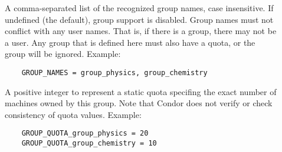 \begin{description}

\item[] \label{param:GroupNames}
  A comma-separated list of the recognized group names, case insensitive.
  If undefined (the default), group support is disabled.
  Group names must not conflict with any user names.
  That is, if there is a \verb@physics@ group, there may not be
  a \verb@physics@ user.
  Any group that is defined here must also have a quota,
  or the group will be ignored. Example: 
  \begin{verbatim}
    GROUP_NAMES = group_physics, group_chemistry 
  \end{verbatim}

\item[] \label{param:GroupQuotaGroupname}
  A positive integer  to represent a static quota specifing
  the exact number of machines owned by this group.
  Note that Condor does not verify or check consistency of quota values.
  Example:
  \begin{verbatim}
    GROUP_QUOTA_group_physics = 20
    GROUP_QUOTA_group_chemistry = 10
  \end{verbatim}

%



\end{description}
